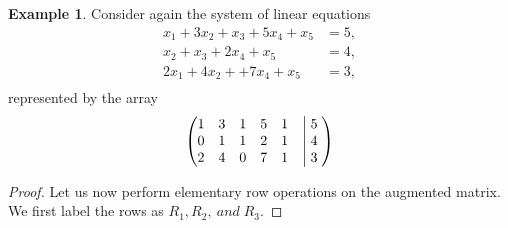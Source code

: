\documentclass[a4paper]{article}
\theoremstyle{definition}
\newtheorem*{eg}{Example}
\begin{document}
\begin{eg}
      Consider again the system of linear equations
      \begin{align*}
          x_1+3x_2+x_3+5x_4+x_5 &= 5, \\
               x_2+x_3+2x_4+x_5 &= 4, \\
          2x_1+4x_2+  +7x_4+x_5 &= 3, \\
     \end{align*}
     represented by the array
     \begin{equation*}
          \begin{pmatrix}
               1 & 3 & 1 & 5 & 1 &\bigm|  5\; \\
               0 & 1 & 1 & 2 & 1 &\bigm|  4\; \\ 
               2 & 4 & 0 & 7 & 1 &\bigm|  3\;
           \end{pmatrix}
     \end{equation*}
\begin{proof}
     Let us now perform elementary row operations on the augmented matrix. 
     We first label the rows as $R_1, R_2,\:and\;R_3$.


\end{proof}
\end{eg}
\end{document}
